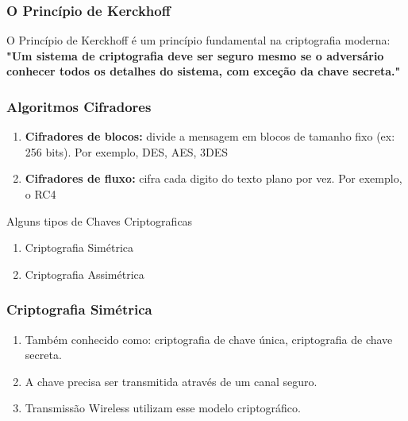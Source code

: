 \documentclass[compress]{beamer}
\begin{document}
\begin{frame}
\frametitle{O Princípio de Kerckhoff}
	\center
	O Princípio de Kerckhoff é um princípio fundamental na criptografia moderna: \\
	\textbf{"Um sistema de criptografia deve ser seguro mesmo se o adversário conhecer todos os detalhes do sistema, com exceção da chave secreta."}
\end{frame}

\begin{frame}
\frametitle{Algoritmos Cifradores}
\justifying
\begin{enumerate}
	\item<+->{\textbf{Cifradores de blocos:} divide a mensagem
		em blocos de tamanho fixo (ex: 256 bits). Por exemplo, DES, AES, 3DES}
	\item<+->{\textbf{Cifradores de fluxo:} cifra cada digito do texto plano por vez. Por exemplo, o RC4}
\end{enumerate}
\end{frame}

\begin{frame}{Alguns tipos de Chaves Criptograficas}
		\begin{enumerate}
			\item<+->{Criptografia Simétrica}
			\item<+->{Criptografia Assimétrica}
		\end{enumerate}
\end{frame}

\begin{frame}
\frametitle{Criptografia Simétrica}
\begin{enumerate}
	\item<+->{Também conhecido como: criptografia de chave única, criptografia de chave secreta.}
	\item<+->{A chave precisa ser transmitida através de um canal seguro.}
	\item<+->{Transmissão Wireless utilizam esse modelo criptográfico.}
\end{enumerate}
\end{frame}
\end{document}
